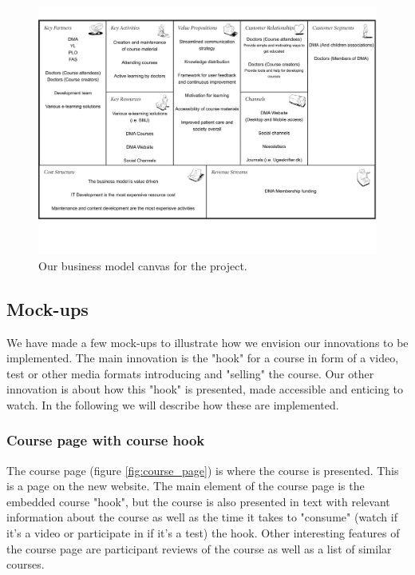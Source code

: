 \begin{figure}[h!]
 \begin{center}
  \includegraphics[width=1\textwidth]{figures/Business-Model-Canvas.pdf}
  \caption{Our business model canvas for the project.\label{fig:bmc_revised}}
 \end{center}
\end{figure}

\subsection{Mock-ups}
We have made a few mock-ups to illustrate how we envision our innovations to be implemented. The main innovation is the "hook" for a course in form of a video, test or other media formats introducing and "selling" the course. Our other innovation is about how this "hook" is presented, made accessible and enticing to watch. In the following we will describe how these are implemented.

\subsubsection{Course page with course hook}
The course page (figure \ref{fig:course_page}) is where the course is presented. This is a page on the new website. The main element of the course page is the embedded course "hook", but the course is also presented in text with relevant information about the course as well as the time it takes to "consume" (watch if it's a video or participate in if it's a test) the hook. Other interesting features of the course page are participant reviews of the course as well as a list of similar courses.

